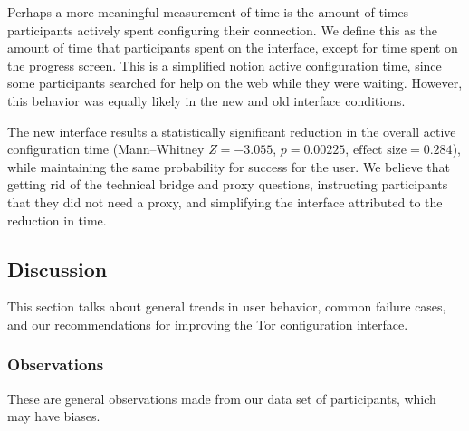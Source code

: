 \documentclass[USenglish,oneside,twocolumn]{article}
\begin{document}
Perhaps a more meaningful measurement of time is the amount of times participants actively spent configuring their connection. We define this as the amount of time that participants spent on the interface, except for time spent on the progress screen. This is a simplified notion active configuration time, since some participants searched for help on the web while they were waiting. However, this behavior was equally likely in the new and old interface conditions.

The new interface results a statistically significant reduction in the overall active configuration time (Mann--Whitney $Z = -3.055$, $p = 0.00225$, $\mbox{effect size} = 0.284$), while maintaining the same probability for success for the user. We believe that getting rid of the technical bridge and proxy questions, instructing participants that they did not need a proxy, and simplifying the interface attributed to the reduction in time. 

\subsection{Discussion} 
This section talks about general trends in user behavior, common failure cases, and our recommendations for 
improving the Tor configuration interface. 

\subsubsection{Observations}
These are general observations made from our data set of participants, which may have biases.\\
\end{document}
